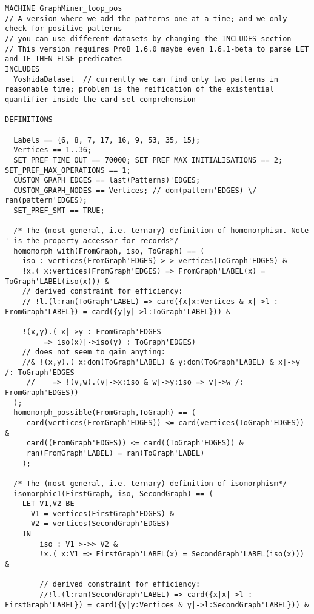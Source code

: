 \begin{lstlisting}[caption=ProB frequent graph mining model (only positive examples), style=model]
MACHINE GraphMiner_loop_pos
// A version where we add the patterns one at a time; and we only check for positive patterns
// you can use different datasets by changing the INCLUDES section
// This version requires ProB 1.6.0 maybe even 1.6.1-beta to parse LET and IF-THEN-ELSE predicates
INCLUDES
  YoshidaDataset  // currently we can find only two patterns in reasonable time; problem is the reification of the existential quantifier inside the card set comprehension 

DEFINITIONS

  Labels == {6, 8, 7, 17, 16, 9, 53, 35, 15};
  Vertices == 1..36;
  SET_PREF_TIME_OUT == 70000; SET_PREF_MAX_INITIALISATIONS == 2; SET_PREF_MAX_OPERATIONS == 1; 
  CUSTOM_GRAPH_EDGES == last(Patterns)'EDGES;
  CUSTOM_GRAPH_NODES == Vertices; // dom(pattern'EDGES) \/ ran(pattern'EDGES);
  SET_PREF_SMT == TRUE;

  /* The (most general, i.e. ternary) definition of homomorphism. Note ' is the property accessor for records*/
  homomorph_with(FromGraph, iso, ToGraph) == (
    iso : vertices(FromGraph'EDGES) >-> vertices(ToGraph'EDGES) &
    !x.( x:vertices(FromGraph'EDGES) => FromGraph'LABEL(x) = ToGraph'LABEL(iso(x))) &
    // derived constraint for efficiency:
    // !l.(l:ran(ToGraph'LABEL) => card({x|x:Vertices & x|->l : FromGraph'LABEL}) = card({y|y|->l:ToGraph'LABEL})) &
    
    !(x,y).( x|->y : FromGraph'EDGES
         => iso(x)|->iso(y) : ToGraph'EDGES) 
    // does not seem to gain anyting:
    //& !(x,y).( x:dom(ToGraph'LABEL) & y:dom(ToGraph'LABEL) & x|->y /: ToGraph'EDGES 
     //    => !(v,w).(v|->x:iso & w|->y:iso => v|->w /: FromGraph'EDGES))
  );
  homomorph_possible(FromGraph,ToGraph) == (
     card(vertices(FromGraph'EDGES)) <= card(vertices(ToGraph'EDGES)) &
     card((FromGraph'EDGES)) <= card((ToGraph'EDGES)) &
     ran(FromGraph'LABEL) = ran(ToGraph'LABEL) 
    );

  /* The (most general, i.e. ternary) definition of isomorphism*/
  isomorphic1(FirstGraph, iso, SecondGraph) == (  
    LET V1,V2 BE
      V1 = vertices(FirstGraph'EDGES) &
      V2 = vertices(SecondGraph'EDGES) 
    IN
		iso : V1 >->> V2 &
		!x.( x:V1 => FirstGraph'LABEL(x) = SecondGraph'LABEL(iso(x))) &
	
		// derived constraint for efficiency:
		//!l.(l:ran(SecondGraph'LABEL) => card({x|x|->l : FirstGraph'LABEL}) = card({y|y:Vertices & y|->l:SecondGraph'LABEL})) &
	

\end{lstlisting}
